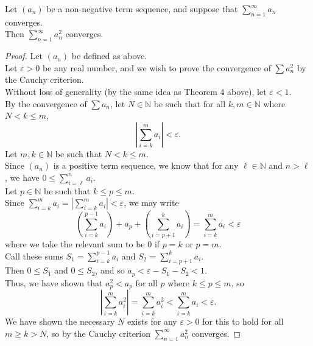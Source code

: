 \documentclass{article}
\newenvironment{theorem}[1]{\renewcommand\theinnercustomthm{#1}\innercustomthm}
  {\endinnercustomthm}
\begin{document}
\newpage{}
\begin{theorem}{6}
    Let $(a_n)$ be a non-negative term sequence, and suppose that $\sum\limits_{n=1}^\infty a_n$ converges. \\
    Then $\sum\limits_{n=1}^\infty a_n^2$ converges.
\end{theorem}
\begin{proof}
    Let $(a_n)$ be defined as above. \\
    Let $\varepsilon > 0$ be any real number, and we wish to prove the convergence of $\sum a_n^2$ by the Cauchy criterion. \\
    Without loss of generality (by the same idea as Theorem 4 above), let $\varepsilon < 1$. \\
    By the convergence of $\sum a_n$, let $N \in \mathbb N$ be such that for all $k,m \in \mathbb N$ where $N < k \le m$, \[ \left|\sum\limits_{i=k}^m a_i\right| < \varepsilon. \]
    Let $m,k \in \mathbb N$ be such that $N < k \le m$.\\
    Since $(a_n)$ is a positive term sequence, we know that for any $\ell \in \mathbb N$ and $n > \ell$, we have $0\le\sum\limits_{i=\ell}^n a_i$. \\
    Let $p \in \mathbb N$ be such that $k \le p \le m$. \\
    Since $\sum\limits_{i=k}^m a_i=\left|\sum\limits_{i=k}^m a_i\right|< \varepsilon$, we may write
    \[
    \left(\sum\limits_{i=k}^{p-1}a_i\right) + a_p + \left(\sum\limits_{i=p+1}^k a_i\right)= \sum\limits_{i=k}^m a_i < \varepsilon
    \]
    where we take the relevant sum to be $0$ if $p=k$ or $p=m$. \\ Call these sums $S_1 = \sum\limits_{i=k}^{p-1}a_i$ and $S_2 = \sum\limits_{i=p+1}^k a_i$. \\
    Then $0\le S_1$ and $0 \le S_2$, and so $a_p < \varepsilon - S_1 - S_2 <1$. \\
    Thus, we have shown that $a_p^2 < a_p$ for all $p$ where $k \le p \le m$, so \[\left|\sum\limits_{i=k}^m a_i^2\right|=\sum\limits_{i=k}^m a_i^2 < \sum\limits_{i=k}^m a_i < \varepsilon.\]
    We have shown the necessary $N$ exists for any $\varepsilon > 0$ for this to hold for all $m \ge k > N$, so by the Cauchy criterion $\sum\limits_{n=1}^\infty a_n^2$ converges.
\end{proof}

\end{document}
